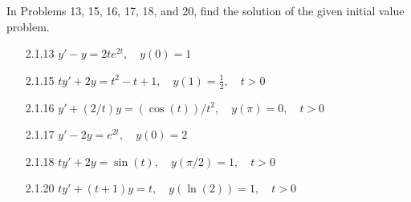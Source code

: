 In Problems 13, 15, 16, 17, 18, and 20, find the solution of the given initial
value problem.
\begin{enumerate}
   \item[2.1.13]  $y' - y = 2te^{2t}, \quad y(0) = 1$
   \item[2.1.15]  $ty' + 2y = t^2 - t + 1, \quad y(1) = \frac{1}{2},
                                           \quad t > 0$
   \item[2.1.16]  $y' + (2/t)y = (\cos(t))/t^2, \quad y(\pi) = 0, \quad t > 0$
   \item[2.1.17]  $y' - 2y = e^{2t}, \quad y(0) = 2$
   \item[2.1.18]  $ty' + 2y = \sin(t), \quad y(\pi/2) = 1, \quad t > 0$
   \item[2.1.20]  $ty' + (t + 1)y = t, \quad y(\ln(2)) = 1, \quad t > 0$
\end{enumerate}
